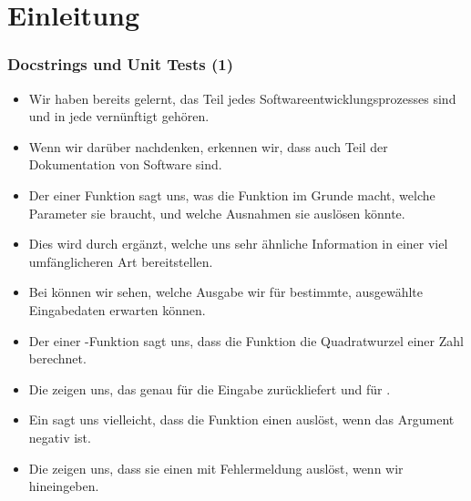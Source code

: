 \documentclass[aspectratio=169,mathserif,notheorems]{beamer}%
\subtitle{36.~Zwischenspiel: Doctests}%
\begin{document}
%
%
\startPresentation%
%
\section{Einleitung}%
\begin{frame}%
\frametitle{Docstrings und Unit Tests (1)}%
\begin{itemize}%
\item Wir haben bereits gelernt, das  Teil jedes Softwareentwicklungsprozesses sind und in jede vernünftigt  gehören.%
%
\item<2-> Wenn wir darüber nachdenken, erkennen wir, dass  auch Teil der Dokumentation von Software sind.%
%
\item<3-> Der  einer Funktion sagt uns, was die Funktion im Grunde macht, welche Parameter sie braucht, und welche Ausnahmen sie auslösen könnte.%
%
\item<4-> Dies wird durch  ergänzt, welche uns sehr ähnliche Information in einer viel umfänglicheren Art bereitstellen.%
%
\item<5-> Bei  können wir sehen, welche Ausgabe wir für bestimmte, ausgewählte Eingabedaten erwarten können.%
%
\item<6-> Der  einer -Funktion sagt uns, dass die Funktion die Quadratwurzel einer Zahl berechnet.%
%
\item<7-> Die  zeigen uns, das  genau  für die Eingabe  zurückliefert und  für .%
%
\item<8-> Ein   sagt uns vielleicht, dass die Funktion einen  auslöst, wenn das Argument negativ ist.%
%
\item<9-> Die  zeigen uns, dass sie einen  mit Fehlermeldung \emph{} auslöst, wenn wir  hineingeben.%
\end{itemize}%
\end{frame}%
%
\end{document}
